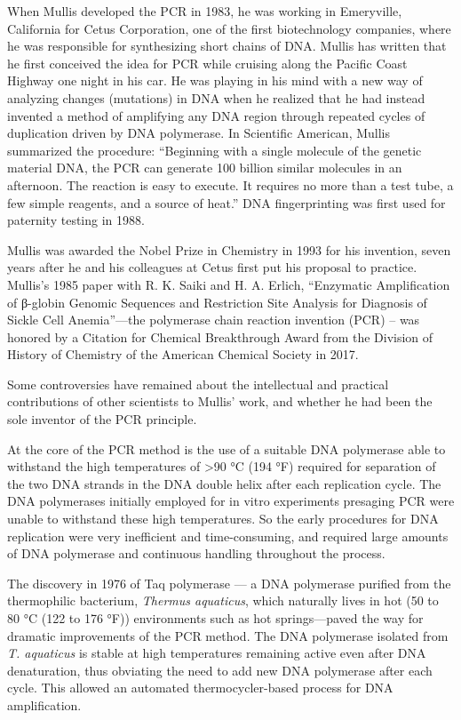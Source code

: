 When Mullis developed the PCR in 1983, he was working in Emeryville, California for Cetus Corporation, one of the first biotechnology companies, where he was responsible for synthesizing short chains of DNA. Mullis has written that he first conceived the idea for PCR while cruising along the Pacific Coast Highway one night in his car. He was playing in his mind with a new way of analyzing changes (mutations) in DNA when he realized that he had instead invented a method of amplifying any DNA region through repeated cycles of duplication driven by DNA polymerase. In Scientific American, Mullis summarized the procedure: ``Beginning with a single molecule of the genetic material DNA, the PCR can generate 100 billion similar molecules in an afternoon. The reaction is easy to execute. It requires no more than a test tube, a few simple reagents, and a source of heat.'' DNA fingerprinting was first used for paternity testing in 1988.

Mullis was awarded the Nobel Prize in Chemistry in 1993 for his invention, seven years after he and his colleagues at Cetus first put his proposal to practice. Mullis's 1985 paper with R. K. Saiki and H. A. Erlich, ``Enzymatic Amplification of β-globin Genomic Sequences and Restriction Site Analysis for Diagnosis of Sickle Cell Anemia''---the polymerase chain reaction invention (PCR) -- was honored by a Citation for Chemical Breakthrough Award from the Division of History of Chemistry of the American Chemical Society in 2017.

Some controversies have remained about the intellectual and practical contributions of other scientists to Mullis' work, and whether he had been the sole inventor of the PCR principle.

At the core of the PCR method is the use of a suitable DNA polymerase able to withstand the high temperatures of \textgreater{}90 °C (194 °F) required for separation of the two DNA strands in the DNA double helix after each replication cycle. The DNA polymerases initially employed for in vitro experiments presaging PCR were unable to withstand these high temperatures. So the early procedures for DNA replication were very inefficient and time-consuming, and required large amounts of DNA polymerase and continuous handling throughout the process.

The discovery in 1976 of Taq polymerase --- a DNA polymerase purified from the thermophilic bacterium, \emph{Thermus aquaticus}, which naturally lives in hot (50 to 80 °C (122 to 176 °F)) environments such as hot springs---paved the way for dramatic improvements of the PCR method. The DNA polymerase isolated from \emph{T. aquaticus} is stable at high temperatures remaining active even after DNA denaturation, thus obviating the need to add new DNA polymerase after each cycle. This allowed an automated thermocycler-based process for DNA amplification.

